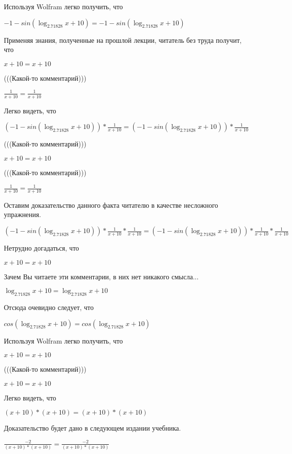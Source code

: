 \documentclass[12pt,a4paper,fleqn]{article}
\theoremstyle{definition}
\begin{document}
Используя Wolfram легко получить, что 

$ -1  - sin(\log_{ 2.71828 }{ x  +  10 }) =  -1  - sin(\log_{ 2.71828 }{ x  +  10 })$

Применяя знания, полученные на прошлой лекции, читатель без труда получит, что 

$ x  +  10  =  x  +  10 $

(((Какой-то комментарий))) 

$\frac{ 1 }{ x  +  10 }
 = \frac{ 1 }{ x  +  10 }
$

Легко видеть, что 

$( -1  - sin(\log_{ 2.71828 }{ x  +  10 })) * \frac{ 1 }{ x  +  10 }
 = ( -1  - sin(\log_{ 2.71828 }{ x  +  10 })) * \frac{ 1 }{ x  +  10 }
$

(((Какой-то комментарий))) 

$ x  +  10  =  x  +  10 $

(((Какой-то комментарий))) 

$\frac{ 1 }{ x  +  10 }
 = \frac{ 1 }{ x  +  10 }
$

Оставим доказательство данного факта читателю в качестве несложного упражнения. 

$( -1  - sin(\log_{ 2.71828 }{ x  +  10 })) * \frac{ 1 }{ x  +  10 }
 * \frac{ 1 }{ x  +  10 }
 = ( -1  - sin(\log_{ 2.71828 }{ x  +  10 })) * \frac{ 1 }{ x  +  10 }
 * \frac{ 1 }{ x  +  10 }
$

Нетрудно догадаться, что 

$ x  +  10  =  x  +  10 $

Зачем Вы читаете эти комментарии, в них нет никакого смысла... 

$\log_{ 2.71828 }{ x  +  10 } = \log_{ 2.71828 }{ x  +  10 }$

Отсюда очевидно следует, что 

$cos(\log_{ 2.71828 }{ x  +  10 }) = cos(\log_{ 2.71828 }{ x  +  10 })$

Используя Wolfram легко получить, что 

$ x  +  10  =  x  +  10 $

(((Какой-то комментарий))) 

$ x  +  10  =  x  +  10 $

Легко видеть, что 

$( x  +  10 ) * ( x  +  10 ) = ( x  +  10 ) * ( x  +  10 )$

Доказательство будет дано в следующем издании учебника. 

$\frac{ -2 }{( x  +  10 ) * ( x  +  10 )}
 = \frac{ -2 }{( x  +  10 ) * ( x  +  10 )}
$
\end{document}
